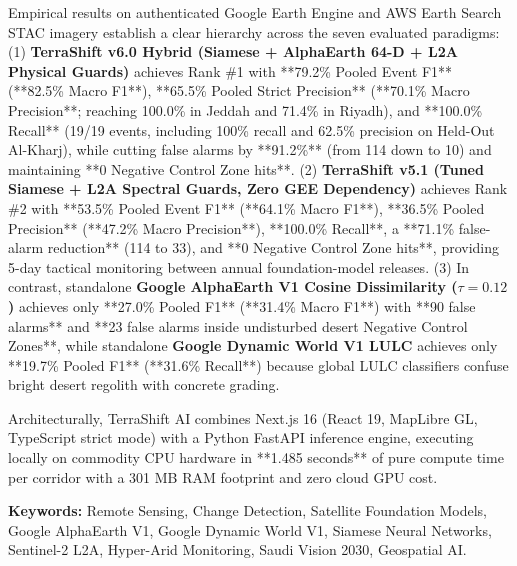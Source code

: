 Empirical results on authenticated Google Earth Engine and AWS Earth Search STAC imagery establish a clear hierarchy across the seven evaluated paradigms:
(1) \textbf{TerraShift v6.0 Hybrid (Siamese + AlphaEarth 64-D + L2A Physical Guards)} achieves Rank \#1 with **79.2\% Pooled Event F1** (**82.5\% Macro F1**), **65.5\% Pooled Strict Precision** (**70.1\% Macro Precision**; reaching 100.0\% in Jeddah and 71.4\% in Riyadh), and **100.0\% Recall** (19/19 events, including 100\% recall and 62.5\% precision on Held-Out Al-Kharj), while cutting false alarms by **91.2\%** (from 114 down to 10) and maintaining **0 Negative Control Zone hits**.
(2) \textbf{TerraShift v5.1 (Tuned Siamese + L2A Spectral Guards, Zero GEE Dependency)} achieves Rank \#2 with **53.5\% Pooled Event F1** (**64.1\% Macro F1**), **36.5\% Pooled Precision** (**47.2\% Macro Precision**), **100.0\% Recall**, a **71.1\% false-alarm reduction** (114 to 33), and **0 Negative Control Zone hits**, providing 5-day tactical monitoring between annual foundation-model releases.
(3) In contrast, standalone \textbf{Google AlphaEarth V1 Cosine Dissimilarity ($\tau=0.12$)} achieves only **27.0\% Pooled F1** (**31.4\% Macro F1**) with **90 false alarms** and **23 false alarms inside undisturbed desert Negative Control Zones**, while standalone \textbf{Google Dynamic World V1 LULC} achieves only **19.7\% Pooled F1** (**31.6\% Recall**) because global LULC classifiers confuse bright desert regolith with concrete grading.

Architecturally, TerraShift AI combines Next.js 16 (React 19, MapLibre GL, TypeScript strict mode) with a Python FastAPI inference engine, executing locally on commodity CPU hardware in **1.485 seconds** of pure compute time per corridor with a 301 MB RAM footprint and zero cloud GPU cost.

\vspace*{1.0cm}
\noindent
\textbf{Keywords:} Remote Sensing, Change Detection, Satellite Foundation Models, Google AlphaEarth V1, Google Dynamic World V1, Siamese Neural Networks, Sentinel-2 L2A, Hyper-Arid Monitoring, Saudi Vision 2030, Geospatial AI.
\newpage
